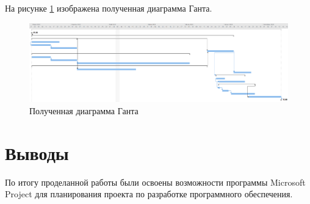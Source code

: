 На рисунке \ref{p9} изображена полученная диаграмма Ганта.
\begin{figure}[!h]
	\centering
	\includegraphics[width=1\linewidth]{inc/img/9.png}
	\caption{Полученная диаграмма Ганта}
	\label{p9}
\end{figure}

\section*{Выводы}
По итогу проделанной работы были освоены возможности программы Microsoft Project для планирования проекта по разработке программного обеспечения.